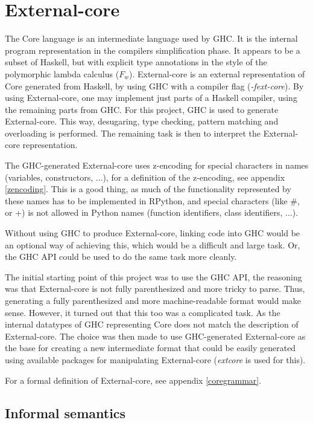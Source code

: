 
\section{External-core}


The Core language is an intermediate language used by GHC. It is the internal
program representation in the compilers simplification phase. It appears to be a
subset of Haskell, but with explicit type annotations in the style of the polymorphic
lambda calculus ($F_w$). External-core
is an external representation of Core generated from Haskell, by using GHC with a compiler 
flag (\emph{-fext-core}). By using External-core, one
may implement just parts of a Haskell compiler, using the remaining parts from
GHC. For this project, GHC is used to generate External-core. This way, desugaring,
type checking, pattern matching and overloading is performed. The remaining task
is then to interpret the External-core representation. \cite{tolmach2010ghc}

The GHC-generated External-core uses z-encoding for special characters in names 
(variables, constructors, ...), for
a definition of the z-encoding, see appendix \ref{zencoding}. This is a good thing, as much
of the functionality represented by these names has to be implemented in RPython,
and special characters (like \#{}, or +) is not allowed in Python names (function
identifiers, class identifiers, ...).

Without using GHC to produce External-core, linking code into GHC would be an 
optional way of achieving this, which would be a difficult and large task.
Or, the GHC API could be used to do the same task more cleanly. \cite{tolmach2010ghc}

The initial starting point of this project was to use the GHC API, the reasoning
was that External-core is not fully parenthesized and more tricky to parse. Thus,
generating a fully parenthesized and more machine-readable format would make sense.
However, it turned out that this too was a complicated task. As the internal
datatypes of GHC representing Core does not match the description of External-core. 
The choice was
then made to use GHC-generated External-core as the base for creating a new intermediate
format that could be easily generated using available packages for manipulating
External-core (\emph{extcore} is used for this).

For a formal definition of External-core, see appendix \ref{coregrammar}.

\subsection{Informal semantics}

